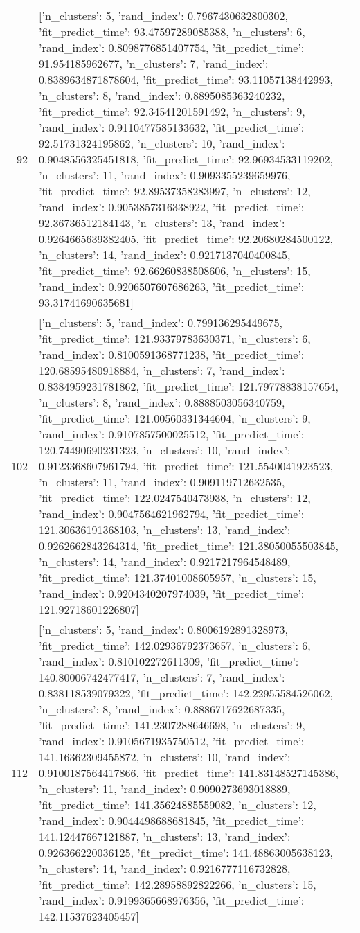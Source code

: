 \begin{tabular}{rl}
92 & [{'n_clusters': 5, 'rand_index': 0.7967430632800302, 'fit_predict_time': 93.47597289085388}, {'n_clusters': 6, 'rand_index': 0.8098776851407754, 'fit_predict_time': 91.954185962677}, {'n_clusters': 7, 'rand_index': 0.8389634871878604, 'fit_predict_time': 93.11057138442993}, {'n_clusters': 8, 'rand_index': 0.8895085363240232, 'fit_predict_time': 92.34541201591492}, {'n_clusters': 9, 'rand_index': 0.9110477585133632, 'fit_predict_time': 92.51731324195862}, {'n_clusters': 10, 'rand_index': 0.9048556325451818, 'fit_predict_time': 92.96934533119202}, {'n_clusters': 11, 'rand_index': 0.9093355239659976, 'fit_predict_time': 92.89537358283997}, {'n_clusters': 12, 'rand_index': 0.9053857316338922, 'fit_predict_time': 92.36736512184143}, {'n_clusters': 13, 'rand_index': 0.9264665639382405, 'fit_predict_time': 92.20680284500122}, {'n_clusters': 14, 'rand_index': 0.9217137040400845, 'fit_predict_time': 92.66260838508606}, {'n_clusters': 15, 'rand_index': 0.9206507607686263, 'fit_predict_time': 93.31741690635681}] \\
102 & [{'n_clusters': 5, 'rand_index': 0.799136295449675, 'fit_predict_time': 121.93379783630371}, {'n_clusters': 6, 'rand_index': 0.8100591368771238, 'fit_predict_time': 120.68595480918884}, {'n_clusters': 7, 'rand_index': 0.8384959231781862, 'fit_predict_time': 121.79778838157654}, {'n_clusters': 8, 'rand_index': 0.8888503056340759, 'fit_predict_time': 121.00560331344604}, {'n_clusters': 9, 'rand_index': 0.9107857500025512, 'fit_predict_time': 120.74490690231323}, {'n_clusters': 10, 'rand_index': 0.9123368607961794, 'fit_predict_time': 121.5540041923523}, {'n_clusters': 11, 'rand_index': 0.909119712632535, 'fit_predict_time': 122.0247540473938}, {'n_clusters': 12, 'rand_index': 0.9047564621962794, 'fit_predict_time': 121.30636191368103}, {'n_clusters': 13, 'rand_index': 0.9262662843264314, 'fit_predict_time': 121.38050055503845}, {'n_clusters': 14, 'rand_index': 0.9217217964548489, 'fit_predict_time': 121.37401008605957}, {'n_clusters': 15, 'rand_index': 0.9204340207974039, 'fit_predict_time': 121.92718601226807}] \\
112 & [{'n_clusters': 5, 'rand_index': 0.8006192891328973, 'fit_predict_time': 142.02936792373657}, {'n_clusters': 6, 'rand_index': 0.810102272611309, 'fit_predict_time': 140.80006742477417}, {'n_clusters': 7, 'rand_index': 0.838118539079322, 'fit_predict_time': 142.22955584526062}, {'n_clusters': 8, 'rand_index': 0.8886717622687335, 'fit_predict_time': 141.2307288646698}, {'n_clusters': 9, 'rand_index': 0.9105671935750512, 'fit_predict_time': 141.16362309455872}, {'n_clusters': 10, 'rand_index': 0.9100187564417866, 'fit_predict_time': 141.83148527145386}, {'n_clusters': 11, 'rand_index': 0.9090273693018889, 'fit_predict_time': 141.35624885559082}, {'n_clusters': 12, 'rand_index': 0.9044498688681845, 'fit_predict_time': 141.12447667121887}, {'n_clusters': 13, 'rand_index': 0.926366220036125, 'fit_predict_time': 141.48863005638123}, {'n_clusters': 14, 'rand_index': 0.9216777116732828, 'fit_predict_time': 142.28958892822266}, {'n_clusters': 15, 'rand_index': 0.9199365668976356, 'fit_predict_time': 142.11537623405457}] \\

\end{tabular}
